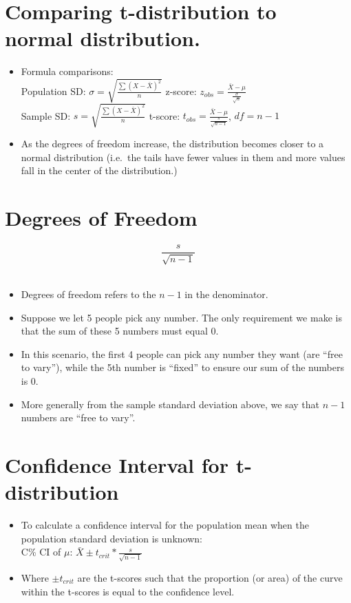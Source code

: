 \documentclass[12pt]{article}
\begin{document}
\section{Comparing t-distribution to normal
distribution.}\label{comparing-t-distribution-to-normal-distribution.-1}

\begin{itemize}
\item
  Formula comparisons:\\Population SD:
  \(\sigma = \sqrt{\frac{\sum(X - \bar{X})^2}{n}}\) z-score:
  \(z_{obs} = \frac{\bar{X} - \mu}{\frac{\sigma}{\sqrt{n}}}\)\\Sample
  SD: \(s = \sqrt{\frac{\sum(X - \bar{X})^2}{n}}\) t-score:
  \(t_{obs} = \frac{\bar{X} - \mu}{\frac{s}{\sqrt{n-1}}}\), \(df = n - 1\)
\item
  As the degrees of freedom increase, the distribution becomes closer to
  a normal distribution (i.e.~the tails have fewer values in them and
  more values fall in the center of the distribution.)
\end{itemize}

\section{Degrees of Freedom}\label{degrees-of-freedom}

\[ \frac{s}{\sqrt{n-1}} \]\\
\begin{itemize}
\item Degrees of freedom refers to the \(n-1\) in the denominator. 
\item Suppose we let 5 people pick any number. The only requirement we make is that the sum of these 5
numbers must equal 0. 
\item In this scenario, the first 4 people can pick
any number they want (are ``free to vary''), while the 5th number is
``fixed'' to ensure our sum of the numbers is 0. 
\item More generally from
the sample standard deviation above, we say that \(n-1\) numbers are
``free to vary''.
\end{itemize}

\section{Confidence Interval for
t-distribution}\label{confidence-interval-for-t-distribution}

\begin{itemize}
\itemsep1pt\parskip0pt
\item
  To calculate a confidence interval for the population mean when the
  population standard deviation is unknown:\\C\% CI of \(\mu\):
  \(\bar{X} \pm t_{crit} * \frac{s}{\sqrt{n - 1}}\)\\
\item
  Where \(\pm t_{crit}\) are the t-scores such that the proportion (or area) of
  the curve within the t-scores is equal to the confidence level.
\end{itemize}
\end{document}
